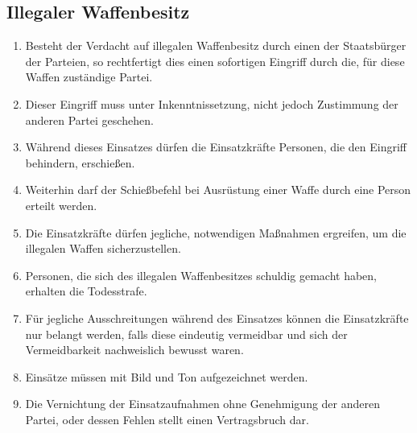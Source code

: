 \documentclass{article}
\begin{document}
\subsection{Illegaler Waffenbesitz}
\begin{enumerate}[(1)]
    \item Besteht der Verdacht auf illegalen Waffenbesitz durch einen der Staatsbürger der Parteien, so rechtfertigt dies einen sofortigen Eingriff durch die, für diese Waffen zuständige Partei.
    \item Dieser Eingriff muss unter Inkenntnissetzung, nicht jedoch Zustimmung der anderen Partei geschehen.
    \item Während dieses Einsatzes dürfen die Einsatzkräfte Personen, die den Eingriff behindern, erschießen.
    \item Weiterhin darf der Schießbefehl bei Ausrüstung einer Waffe durch eine Person erteilt werden.
    \item Die Einsatzkräfte dürfen jegliche, notwendigen Maßnahmen ergreifen, um die illegalen Waffen sicherzustellen.
    \item Personen, die sich des illegalen Waffenbesitzes schuldig gemacht haben, erhalten die Todesstrafe.
    \item Für jegliche Ausschreitungen während des Einsatzes können die Einsatzkräfte nur belangt werden, falls diese eindeutig vermeidbar und sich der Vermeidbarkeit nachweislich bewusst waren.
    \item Einsätze müssen mit Bild und Ton aufgezeichnet werden.
    \item Die Vernichtung der Einsatzaufnahmen ohne Genehmigung der anderen Partei, oder dessen Fehlen stellt einen Vertragsbruch dar.
\end{enumerate}
\end{document}
